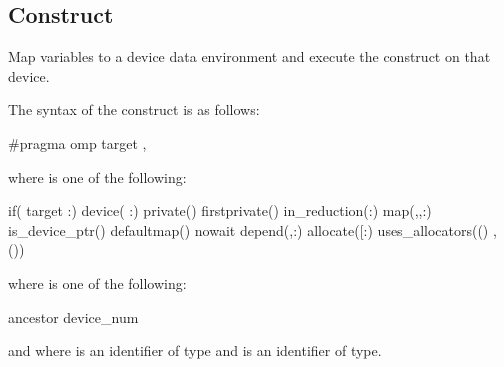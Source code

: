\subsection{ Construct}
\label{subsec:target Construct}
\summary
Map variables to a device data environment and execute the construct on that device.
\syntax
\begin{ccppspecific}
The syntax of the  construct is as follows:

\begin{ompcPragma}
#pragma omp target \plc{[clause[ [},\plc{] clause] ... ] new-line}
\end{ompcPragma}

where  is one of the following:

\begin{indentedcodelist}
if(\plc{[} target :\plc{] scalar-expression})
device(\plc{[ device-modifier} :\plc{] integer-expression})
private()
firstprivate()
in_reduction(:)
map(\plc{[[map-type-modifier[},\plc{] [map-type-modifier[},\plc{] ...] map-type}:\plc{ ] locator-list})
is_device_ptr()
defaultmap()
nowait
depend(\plc{[depend-modifier},\plc{] dependence-type }:)
allocate([\plc{[allocator }:\plc{] list})
uses_allocators(\plc{allocator[}()\plc{]}
	       \plc{[},\plc{allocator[}()\plc{] ...]})
\end{indentedcodelist}

where  is one of the following:
\begin{indentedcodelist}
ancestor
device_num
\end{indentedcodelist}

and where  is an identifier of  type
and  is an identifier of 
 type.
\end{ccppspecific}

